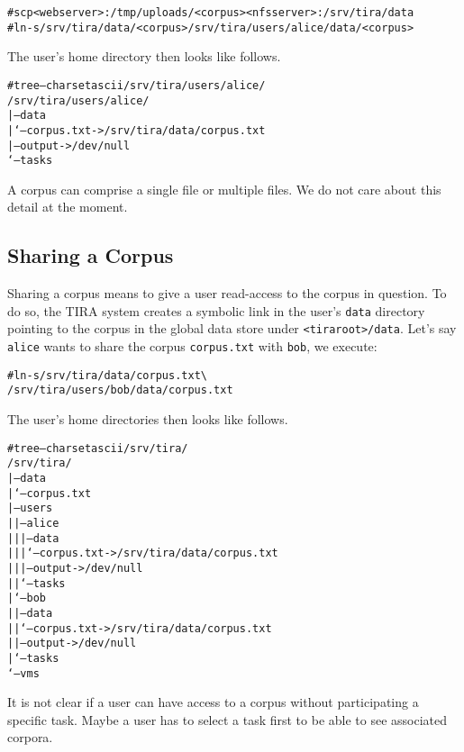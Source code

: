 \documentclass[12pt,a4paper,oneside,titlepage,draft]{report}
\newcommand{\tira}{TIRA\xspace}
\newenvironment{code}
  {\small\color{RubineRed}\begin{alltt}}
  {\end{alltt}}
\newenvironment{note}
  {\small\begin{mdframed}[backgroundcolor=yellow,linewidth=0,skipabove=3,skipbelow=4]}
  {\end{mdframed}}
\begin{document}
\begin{code}
# scp <webserver>:/tmp/uploads/<corpus> <nfsserver>:/srv/tira/data
# ln -s /srv/tira/data/<corpus> /srv/tira/users/alice/data/<corpus>
\end{code}

\noindent
The user's home directory then looks like follows.

\begin{code}
# tree --charset ascii /srv/tira/users/alice/
/srv/tira/users/alice/
|-- data
|   `-- corpus.txt -> /srv/tira/data/corpus.txt
|-- output -> /dev/null
`-- tasks
\end{code}

\begin{note}
A corpus can comprise a single file or multiple files. We do not care about this detail at the moment.
\end{note}

\subsection{Sharing a Corpus}
Sharing a corpus means to give a user read-access to the corpus in question. To do so, the \tira system creates a symbolic link in the user's \texttt{data} directory pointing to the corpus in the global data store under \texttt{<tiraroot>/data}. Let's say \texttt{alice} wants to share the corpus \texttt{corpus.txt} with \texttt{bob}, we execute:

\begin{code}
# ln -s /srv/tira/data/corpus.txt \textbackslash
  /srv/tira/users/bob/data/corpus.txt
\end{code}

\noindent
The user's home directories then looks like follows.

\begin{code}
# tree --charset ascii /srv/tira/
/srv/tira/
|-- data
|   `-- corpus.txt
|-- users
|   |-- alice
|   |   |-- data
|   |   |   `-- corpus.txt -> /srv/tira/data/corpus.txt
|   |   |-- output -> /dev/null
|   |   `-- tasks
|   `-- bob
|       |-- data
|       |   `-- corpus.txt -> /srv/tira/data/corpus.txt
|       |-- output -> /dev/null
|       `-- tasks
`-- vms
\end{code}

\begin{note}
It is not clear if a user can have access to a corpus without participating a specific task. Maybe a user has to select a task first to be able to see associated corpora.
\end{note}
\end{document}
